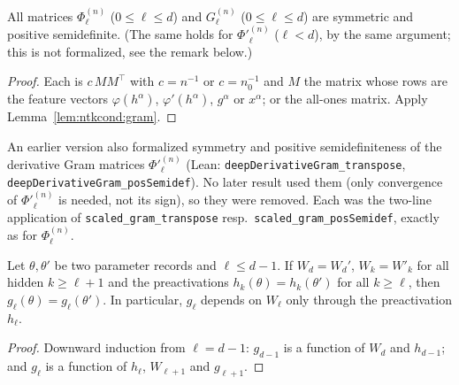\begin{theorem}\label{thm:ntkdn:gramPsd}
  \leanok
All matrices $\Phi_\ell^{(n)}$ ($0\le\ell\le d$) and $G_\ell^{(n)}$ ($0\le\ell\le d$) are symmetric and positive semidefinite. (The same holds for $\Phi'^{(n)}_\ell$ ($\ell<d$), by the same argument; this is not formalized, see the remark below.)
\end{theorem}

\begin{proof}
  \leanok
Each is $c\,MM^\top$ with $c=n^{-1}$ or $c=n_0^{-1}$ and $M$ the matrix whose rows are the feature vectors $\varphi(h^\alpha)$, $\varphi'(h^\alpha)$, $g^\alpha$ or $x^\alpha$; or the all-ones matrix. Apply Lemma~\ref{lem:ntkcond:gram}.
\end{proof}

\begin{remark}\label{rmk:ntkdn:gramPsdChange}
An earlier version also formalized symmetry and positive semidefiniteness of the derivative Gram matrices $\Phi'^{(n)}_\ell$ (Lean: \texttt{deepDerivativeGram\_transpose}, \texttt{deepDerivativeGram\_posSemidef}). No later result used them (only convergence of $\Phi'^{(n)}_\ell$ is needed, not its sign), so they were removed. Each was the two-line application of \texttt{scaled\_gram\_transpose} resp.\ \texttt{scaled\_gram\_posSemidef}, exactly as for $\Phi_\ell^{(n)}$.
\end{remark}


\begin{lemma}\label{lem:ntkdn:suffixCongruence}
  \leanok
Let $\theta,\theta'$ be two parameter records and $\ell\le d-1$. If $W_d=W_d'$, $W_k=W'_k$ for all hidden $k\ge\ell+1$ and the preactivations $h_k(\theta)=h_k(\theta')$ for all $k\ge\ell$, then $g_\ell(\theta)=g_\ell(\theta')$. In particular, $g_{\ell}$ depends on $W_{\ell}$ only through the preactivation $h_\ell$.
\end{lemma}

\begin{proof}
  \leanok
Downward induction from $\ell=d-1$: $g_{d-1}$ is a function of $W_d$ and $h_{d-1}$; and $g_\ell$ is a function of $h_\ell$, $W_{\ell+1}$ and $g_{\ell+1}$.
\end{proof}

